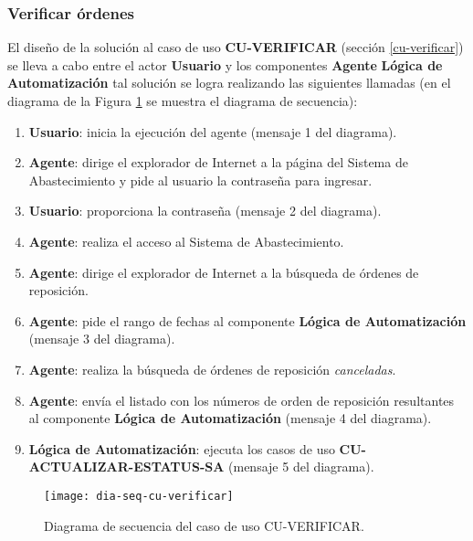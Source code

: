 \subsubsection{Verificar órdenes}
El diseño de la solución al caso de uso \textbf{CU-VERIFICAR} (sección \ref{cu-verificar}) se lleva a cabo entre el actor \textbf{Usuario} y los componentes \textbf{Agente} \textbf{Lógica de Automatización} tal solución se logra realizando las siguientes llamadas (en el diagrama de la Figura \ref{fig:dia-seq-cu-verificar} se muestra el diagrama de secuencia):
\begin{enumerate}
	\item \textbf{Usuario}: inicia la ejecución del agente (mensaje 1 del diagrama).
	\item \textbf{Agente}: dirige el explorador de Internet a la página del Sistema de Abastecimiento y pide al usuario la contraseña para ingresar.
	\item \textbf{Usuario}: proporciona la contraseña (mensaje 2 del diagrama).
	\item \textbf{Agente}: realiza el acceso al Sistema de Abastecimiento.
	\item \textbf{Agente}: dirige el explorador de Internet a la búsqueda de órdenes de reposición.
	\item \textbf{Agente}: pide el rango de fechas al componente \textbf{Lógica de Automatización} (mensaje 3 del diagrama).
	\item \textbf{Agente}: realiza la búsqueda de órdenes de reposición \textit{canceladas}.
	\item \textbf{Agente}: envía el listado con los números de orden de reposición resultantes al componente \textbf{Lógica de Automatización} (mensaje 4 del diagrama).
	\item \textbf{Lógica de Automatización}: ejecuta los casos de uso \textbf{CU-ACTUALIZAR-ESTATUS-SA} (mensaje 5 del diagrama).
\end{enumerate}

\begin{figure}[h]
	\centering
	\texttt{[image: dia-seq-cu-verificar]}
	\caption{Diagrama de secuencia del caso de uso CU-VERIFICAR.}
	\label{fig:dia-seq-cu-verificar}
\end{figure}


